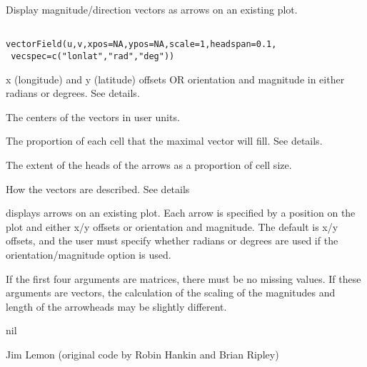 \begin{Description}\relax
Display magnitude/direction vectors as arrows on an existing plot.
\end{Description}
\begin{Usage}
\begin{verbatim}

vectorField(u,v,xpos=NA,ypos=NA,scale=1,headspan=0.1,
 vecspec=c("lonlat","rad","deg"))
\end{verbatim}
\end{Usage}
\begin{Arguments}
\begin{ldescription}
\item[\code{u,v}] x (longitude) and y (latitude) offsets OR
orientation and magnitude in either radians or degrees. See details.
\item[\code{xpos,ypos}] The centers of the vectors in user units.
\item[\code{scale}] The proportion of each cell that the maximal vector will fill.
See details.
\item[\code{headspan}] The extent of the heads of the arrows as a proportion of
cell size.
\item[\code{vecspec}] How the vectors are described. See details
\end{ldescription}
\end{Arguments}
\begin{Details}\relax
{} displays arrows on an existing plot. Each arrow is specified
by a position on the plot  and either x/y offsets or
orientation and magnitude. The default is x/y offsets, and the user must
specify whether radians or degrees are used if the orientation/magnitude option
is used.

If the first four arguments are matrices, there must be no missing values. If
these arguments are vectors, the calculation of the scaling of the magnitudes
and length of the arrowheads may be slightly different.
\end{Details}
\begin{Value}
nil
\end{Value}
\begin{Author}\relax
Jim Lemon (original code by Robin Hankin and Brian Ripley)
\end{Author}
\begin{SeeAlso}\relax
{}
\end{SeeAlso}
